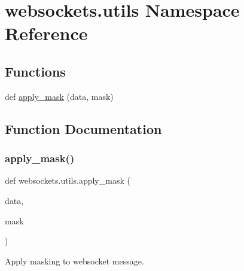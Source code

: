 \hypertarget{namespacewebsockets_1_1utils}{}\section{websockets.\+utils Namespace Reference}
\label{namespacewebsockets_1_1utils}
\subsection*{Functions}
\begin{DoxyCompactItemize}
\item 
def \hyperlink{namespacewebsockets_1_1utils_a8ed141792bd091316d652bd54ef13678}{apply\+\_\+mask} (data, mask)
\end{DoxyCompactItemize}


\subsection{Function Documentation}
\mbox{\label{namespacewebsockets_1_1utils_a8ed141792bd091316d652bd54ef13678}} 
\subsubsection{\texorpdfstring{apply\+\_\+mask()}{apply\_mask()}}
{\footnotesize\ttfamily def websockets.\+utils.\+apply\+\_\+mask (\begin{DoxyParamCaption}\item[{}]{data,  }\item[{}]{mask }\end{DoxyParamCaption})}

\begin{DoxyVerb}Apply masking to websocket message.\end{DoxyVerb}
 